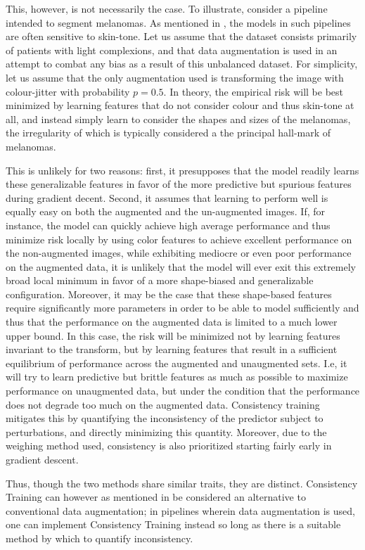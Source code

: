     This, however, is not necessarily the case. To illustrate, consider a pipeline intended to segment melanomas. As mentioned in , the models in such pipelines are often sensitive to skin-tone. Let us assume that the dataset consists primarily of patients with light complexions, and that data augmentation is used in an attempt to combat any bias as a result of this unbalanced dataset. For simplicity, let us assume that the only augmentation used is transforming the image with colour-jitter with probability \(p=0.5\). In theory, the empirical risk will be best minimized by learning features that do not consider colour and thus skin-tone at all, and instead simply learn to consider the shapes and sizes of the melanomas, the irregularity of which is typically considered a the principal hall-mark of melanomas. 
    
    This is unlikely for two reasons: first, it presupposes that the model readily learns these generalizable features in favor of the more predictive but spurious features during gradient decent. Second, it assumes that learning to perform well is equally easy on both the augmented and the un-augmented images. If, for instance, the model can quickly achieve high average performance and thus minimize risk locally by using color features to achieve excellent performance on the non-augmented images, while exhibiting mediocre or even poor performance on the augmented data, it is unlikely that the model will ever exit this extremely broad local minimum in favor of a more shape-biased and generalizable configuration. Moreover, it may be the case that these shape-based features require significantly more parameters in order to be able to model sufficiently and thus that the performance on the augmented data is limited to a much lower upper bound. In this case, the risk will be minimized not by learning features invariant to the transform, but by learning features that result in a sufficient equilibrium of performance across the augmented and unaugmented sets. I.e, it will try to learn predictive but brittle features as much as possible to maximize performance on unaugmented data, but under the condition that the performance does not degrade too much on the augmented data. Consistency training mitigates this by quantifying the inconsistency of the predictor subject to perturbations, and directly minimizing this quantity. Moreover, due to the weighing method used, consistency is also prioritized starting fairly early in gradient descent. 
    
    Thus, though the two methods share similar traits, they are distinct. Consistency Training can however as mentioned in  be considered an alternative to conventional data augmentation; in pipelines wherein data augmentation is used, one can implement Consistency Training instead so long as there is a suitable method by which to quantify inconsistency. 

